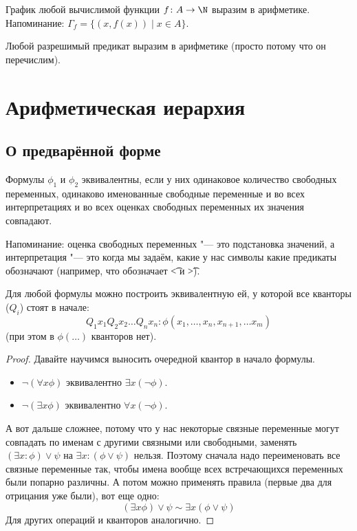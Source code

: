 \begin{conseq}
	График любой вычислимой функции $f \colon A \to \N$ выразим в арифметике.
	Напоминание: $\Gamma_f = \{ (x, f(x)) \mid x \in A \}$.
\end{conseq}
\begin{conseq}
	Любой разрешимый предикат выразим в арифметике (просто потому что он перечислим).
\end{conseq}

\section{Арифметическая иерархия}
\subsection{О предварённой форме}
\begin{Def}
	Формулы $\phi_1$ и $\phi_2$ эквивалентны, если у них одинаковое количество свободных переменных,
	одинаково именованные свободные переменные и во всех интерпретациях и во всех оценках
	свободных переменных их значения совпадают.

	Напоминание: оценка свободных переменных "--- это подстановка значений,
	а интерпретация "--- это когда мы задаём, какие у нас символы какие предикаты обозначают
	(например, что обозначает \t{<} и \t{>}).
\end{Def}

\begin{lemma}
	Для любой формулы можно построить эквивалентную ей, у которой все кванторы ($Q_i$) стоят в начале:
	\[
	Q_1 x_1 Q_2 x_2 \dots Q_n x_n \colon \phi(x_1, \dots, x_n, x_{n+1}, \dots x_m)
	\]
	(при этом в $\phi(\dots)$ кванторов нет).
\end{lemma}
\begin{proof}
	Давайте научимся выносить очередной квантор в начало формулы.
	\begin{itemize}
	\item $\lnot (\forall x \phi)$ эквивалентно $\exists x (\lnot \phi)$.
	\item $\lnot (\exists x \phi)$ эквивалентно $\forall x (\lnot \phi)$.
	\end{itemize}
	А вот дальше сложнее, потому что у нас некоторые связные переменные могут совпадать
	по именам с другими связными или свободными, заменять $(\exists x \colon \phi) \lor \psi$
	на $\exists x \colon (\phi \lor \psi)$ нельзя.
	Поэтому сначала надо переименовать все связные переменные так, чтобы имена вообще всех
	встречающихся переменных были попарно различны.
	А потом можно применять правила (первые два для отрицания уже были), вот еще одно:
	\[ (\exists x \phi) \lor \psi \sim \exists x (\phi \lor \psi) \]
	Для других операций и кванторов аналогично.
\end{proof}

